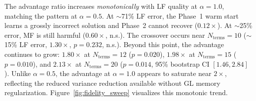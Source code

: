 \documentclass[11pt]{article}
\newcommand{\Ncol}{N_{\mathrm{col}}}
\begin{document}
\begin{table}[t]
\centering
\caption{Fidelity sweep at $\alpha = 1.0$, $\Ncol = 100$ (10 seeds). The advantage ratio increases monotonically beyond $N_{\mathrm{terms}} = 8$: catastrophic at $\sim$71\% LF error ($0.12\times$), crossing unity near $N_{\mathrm{terms}} = 10$ ($1.30\times$, n.s.), and reaching $\mathbf{2.13\times}$ at $N_{\mathrm{terms}} = 20$ ($p = 0.014$). LF errors are relative $L^2$ vs.\ the HF reference on the evaluation grid (same convention as Table~\ref{tab:lf_quality}).}
\label{tab:fidelity_sweep}
\end{table}

The advantage ratio increases \emph{monotonically} with LF quality at $\alpha = 1.0$, matching the pattern at $\alpha = 0.5$. At $\sim$71\% LF error, the Phase~1 warm start learns a grossly incorrect solution and Phase~2 cannot recover ($0.12\times$). At $\sim$25\% error, MF is still harmful ($0.60\times$, n.s.). The crossover occurs near $N_{\mathrm{terms}} = 10$ ($\sim$15\% LF error, $1.30\times$, $p = 0.232$, n.s.). Beyond this point, the advantage continues to grow: $1.80\times$ at $N_{\mathrm{terms}} = 12$ ($p = 0.020$), $1.98\times$ at $N_{\mathrm{terms}} = 15$ ($p = 0.010$), and $\mathbf{2.13\times}$ at $N_{\mathrm{terms}} = 20$ ($p = 0.014$, 95\% bootstrap CI $[1.46, 2.84]$). Unlike $\alpha = 0.5$, the advantage at $\alpha = 1.0$ appears to saturate near $2\times$, reflecting the reduced variance reduction available without GL memory regularization. Figure~\ref{fig:fidelity_sweep} visualizes this monotonic trend.
\end{document}
